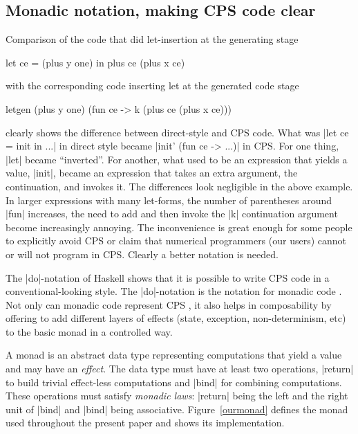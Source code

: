 \documentclass[draft]{elsart}
\begin{document}
\subsection{Monadic notation, making CPS code clear}\label{monadicnotation}

Comparison of the code that did let-insertion at the generating stage
\begin{code}
let ce = (plus y one) in  plus ce (plus x ce)
\end{code}
with the corresponding code inserting let at the generated code stage
\begin{code}
letgen (plus y one) (fun ce -> k (plus ce (plus x ce)))
\end{code}
clearly shows the difference between  direct-style and CPS code.
What was |let ce = init in ...| in direct style became
|init' (fun ce -> ...)| in CPS. For one thing, |let| became
``inverted''. For another, what used to be an expression that yields
a value, |init|, became an expression that takes an extra argument,
the continuation, and invokes it. The differences look negligible in
the above example. In larger expressions with many let-forms, the
number of parentheses around |fun| increases, the need to add and
then invoke the |k| continuation argument become increasingly annoying. The
inconvenience is great enough for some people to explicitly avoid CPS
or claim that numerical programmers (our users) cannot or will not
program in CPS. Clearly a better notation is needed.

The |do|-notation of Haskell \cite{Haskell98Report} shows that it is possible
to write CPS code in a conventional-looking style. The
|do|-notation is the notation for monadic code \cite{moggi-notions}.
Not only can monadic code represent CPS \cite{Filinski:Representing},
it also helps in composability by offering to add different
layers of effects (state, exception, non-determinism, etc) to the
basic monad \cite{liang-interpreter} in a controlled way.

A monad \cite{moggi-notions} is an abstract data type representing
computations that yield a value and may have an \emph{effect}.
The data type must have at least two operations, |return| to build
trivial effect-less computations and |bind| for combining
computations. These operations must satisfy \emph{monadic laws}:
|return| being the left and the right unit of |bind| and |bind| being
associative. Figure~\ref{ourmonad} defines the monad used throughout
the present paper and shows its implementation.
\end{document}
